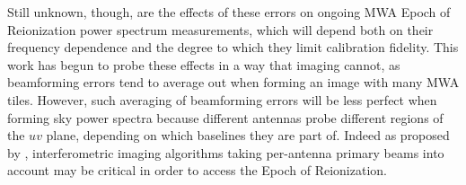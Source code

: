 Still unknown, though, are the effects of these errors on ongoing MWA Epoch of Reionization power spectrum measurements, which will depend both on their frequency dependence and the degree to which they limit calibration fidelity. This work has begun to probe these effects in a way that imaging cannot, as beamforming errors tend to average out when forming an image with many MWA tiles. However, such averaging of beamforming errors will be less perfect when forming sky power spectra because different antennas probe different regions of the $uv$ plane, depending on which baselines they are part of. Indeed as proposed by \citet{moralesandmatejek}, interferometric imaging algorithms taking per-antenna primary beams into account \citep{fhd, dillonmapmaking} may be critical in order to access the Epoch of Reionization.

